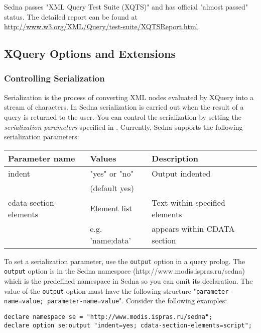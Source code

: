 \documentclass[a4paper,12pt]{article}
\begin{document}
Sedna passes "XML Query Test Suite (XQTS)" and has official "almost passed"
status. The detailed report can be found at
\url{http://www.w3.org/XML/Query/test-suite/XQTSReport.html}


\subsection{XQuery Options and Extensions}
\label{sec:xquery-extensions}

\subsubsection{Controlling Serialization}
\label{indents}
Serialization is the process of converting XML nodes evaluated by XQuery into a
stream of characters. In Sedna serialization is carried out when the result of a
query is returned to the user. You can control the serialization by setting the
\emph{serialization parameters} specified in \cite{paper:query-serialization}.
Currently, Sedna supports the following serialization parameters:

\medskip

\begin{tabular}{|l|l|l|}
\hline
Parameter name & Values & Description \\
\hline
\hline
indent & "yes" or "no" & Output indented \\
  & (default yes) & \\
\hline
cdata-section-elements & Element list & Text within specified elements \\
 & e.g. 'name;data' & appears within CDATA section \\
\hline
\end{tabular}

\medskip

To set a serialization parameter, use the \verb!output! option in a query
prolog. The \verb!output! option is in the Sedna namespace
(http://www.modis.ispras.ru/sedna) which is the predefined namespace in Sedna so
you can omit its declaration. The value of the \verb!output! option must have
the following structure "\verb!parameter-name=value; parameter-name=value!".
Consider the following examples:

\begin{verbatim}
declare namespace se = "http://www.modis.ispras.ru/sedna";
declare option se:output "indent=yes; cdata-section-elements=script";
\end{verbatim}
\end{document}
